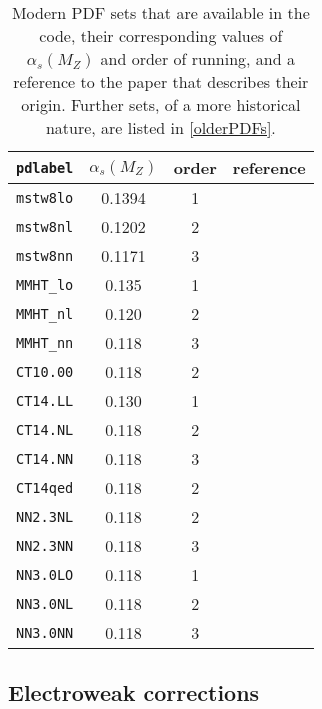 \begin{table}[h]
\begin{center}
\begin{tabular}{|c|c|c|c|}
\hline
{\tt pdlabel}  & $\alpha_s(M_Z)$ & order & reference \\
\hline
{\tt mstw8lo}  & 0.1394 & 1     & \cite{Martin:2009iq} \\
{\tt mstw8nl}  & 0.1202 & 2     & \cite{Martin:2009iq} \\
{\tt mstw8nn}  & 0.1171 & 3     & \cite{Martin:2009iq} \\
{\tt MMHT\_lo}  & 0.135  & 1     & \cite{Harland-Lang:2014zoa} \\
{\tt MMHT\_nl}  & 0.120  & 2     & \cite{Harland-Lang:2014zoa} \\
{\tt MMHT\_nn}  & 0.118  & 3     & \cite{Harland-Lang:2014zoa} \\
\hline
{\tt CT10.00}  & 0.118  & 2     & \cite{Lai:2010vv} \\
{\tt CT14.LL}  & 0.130  & 1     & \cite{Dulat:2015mca} \\
{\tt CT14.NL}  & 0.118  & 2     & \cite{Dulat:2015mca} \\
{\tt CT14.NN}  & 0.118  & 3     & \cite{Dulat:2015mca} \\
{\tt CT14qed}  & 0.118  & 2     & \cite{Schmidt:2015zda} \\
\hline
{\tt NN2.3NL}  & 0.118  & 2     & \cite{Ball:2012cx} \\
{\tt NN2.3NN}  & 0.118  & 3     & \cite{Ball:2012cx} \\
{\tt NN3.0LO}  & 0.118  & 1     & \cite{Ball:2014uwa} \\
{\tt NN3.0NL}  & 0.118  & 2     & \cite{Ball:2014uwa} \\
{\tt NN3.0NN}  & 0.118  & 3     & \cite{Ball:2014uwa} \\
\hline
\end{tabular}
\end{center}
\caption{Modern PDF sets that are available in the code,
their corresponding values of $\alpha_s(M_Z)$ and order of running,
and a reference to the paper
that describes their origin.  Further sets, of a more historical nature, are listed in \cref{olderPDFs}.
\label{pdlabelrecent}}
\end{table}

\subsection{Electroweak corrections}
\label{subsec:EW}

